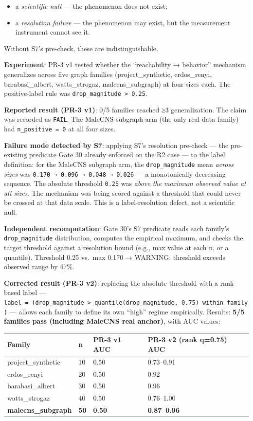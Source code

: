 \documentclass[
]{article}
\newcounter{none} %
\providecommand{\tightlist}{%
  \setlength{\itemsep}{0pt}\setlength{\parskip}{0pt}}
\begin{document}
\begin{itemize}
\tightlist
\item
  a \emph{scientific null} --- the phenomenon does not exist;
\item
  a \emph{resolution failure} --- the phenomenon may exist, but the
  measurement instrument cannot see it.
\end{itemize}

Without S7's pre-check, these are indistinguishable.

\textbf{Experiment}: PR-3 v1 tested whether the ``reachability →
behavior'' mechanism generalizes across five graph families
(project\_synthetic, erdos\_renyi, barabasi\_albert, watts\_strogaz,
malecns\_subgraph) at four sizes each. The positive-label rule was
\texttt{drop\_magnitude\ \textgreater{}\ 0.25}.

\textbf{Reported result (PR-3 v1)}: 0/5 families reached ≥3
generalization. The claim was recorded as \texttt{FAIL}. The MaleCNS
subgraph arm (the only real-data family) had \texttt{n\_positive\ =\ 0}
at all four sizes.

\textbf{Failure mode detected by S7}: applying S7's resolution pre-check
--- the pre-existing predicate Gate 30 already enforced on the R2 case
--- to the label definition: for the MaleCNS subgraph arm, the
\texttt{drop\_magnitude} mean \emph{across sizes} was
\texttt{0.170\ →\ 0.096\ →\ 0.048\ →\ 0.026} --- a monotonically
decreasing sequence. The absolute threshold \texttt{0.25} was
\emph{above the maximum observed value at all sizes}. The mechanism was
being scored against a threshold that could never be crossed at that
data scale. This is a label-resolution defect, not a scientific null.

\textbf{Independent recomputation}: Gate 30's S7 predicate reads each
family's \texttt{drop\_magnitude} distribution, computes the empirical
maximum, and checks the target threshold against a resolution bound
(e.g., max value at each n, or a quantile). Threshold 0.25 vs.~max 0.170
→ WARNING: threshold exceeds observed range by 47\%.

\textbf{Corrected result (PR-3 v2)}: replacing the absolute threshold
with a rank-based label ---
\texttt{label\ =\ (drop\_magnitude\ \textgreater{}\ quantile(drop\_magnitude,\ 0.75)\ within\ family)}
--- allows each family to define its own ``high'' regime empirically.
Results: \textbf{5/5 families pass (including MaleCNS real anchor)},
with AUC values:

{\def\LTcaptype{none} %
\begin{longtable}[]{@{}llll@{}}
\toprule\noalign{}
Family & n & PR-3 v1 AUC & PR-3 v2 (rank q=0.75) AUC \\
\midrule\noalign{}
\endhead
\bottomrule\noalign{}
\endlastfoot
project\_synthetic & 10 & 0.50 & 0.73--0.91 \\
erdos\_renyi & 20 & 0.50 & 0.92 \\
barabasi\_albert & 30 & 0.50 & 0.96 \\
watts\_strogaz & 40 & 0.50 & 0.76--1.00 \\
\textbf{malecns\_subgraph} & \textbf{50} & \textbf{0.50} &
\textbf{0.87--0.96} \\
\end{longtable}
}
\end{document}
